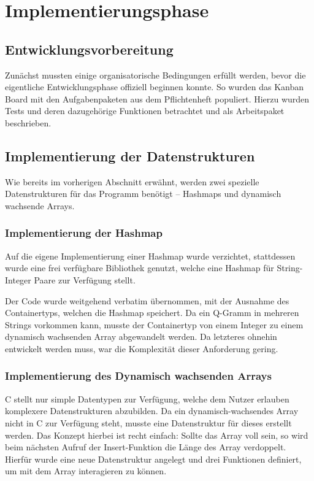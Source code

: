 \section{Implementierungsphase}
\label{section:implementierungsphase}
\subsection{Entwicklungsvorbereitung}
Zunächst mussten einige organisatorische Bedingungen erfüllt werden, bevor die eigentliche Entwicklungsphase offiziell beginnen konnte. So wurden das Kanban Board mit den
Aufgabenpaketen aus dem Pflichtenheft populiert. Hierzu wurden Tests und deren
dazugehörige Funktionen betrachtet und als Arbeitspaket beschrieben.

\subsection{Implementierung der Datenstrukturen}
Wie bereits im vorherigen Abschnitt erwähnt, werden zwei spezielle Datenstrukturen für das Programm benötigt -- Hashmaps und dynamisch wachsende Arrays.

\subsubsection{Implementierung der Hashmap}


Auf die eigene Implementierung einer Hashmap wurde verzichtet, stattdessen wurde
eine frei verfügbare Bibliothek genutzt, welche eine Hashmap für
String-Integer Paare zur Verfügung stellt.

Der Code wurde weitgehend verbatim übernommen, mit der Ausnahme des
Containertyps, welchen die Hashmap speichert. Da ein Q-Gramm in mehreren Strings
vorkommen kann, musste der Containertyp von einem Integer zu einem dynamisch
wachsenden Array abgewandelt werden. Da letzteres ohnehin entwickelt werden muss,
war die Komplexität dieser Anforderung gering.

\subsubsection{Implementierung des Dynamisch wachsenden Arrays}
C stellt nur simple Datentypen zur Verfügung, welche dem Nutzer erlauben komplexere
Datenstrukturen abzubilden. Da ein dynamisch-wachsendes
Array nicht in C zur Verfügung steht, musste eine Datenstruktur für dieses erstellt werden.
Das Konzept hierbei ist recht einfach: Sollte das Array voll sein, so wird beim
nächsten Aufruf der Insert-Funktion die Länge des Array verdoppelt. Hierfür wurde
eine neue Datenstruktur angelegt und drei Funktionen definiert, um mit dem Array
interagieren zu können.\par
